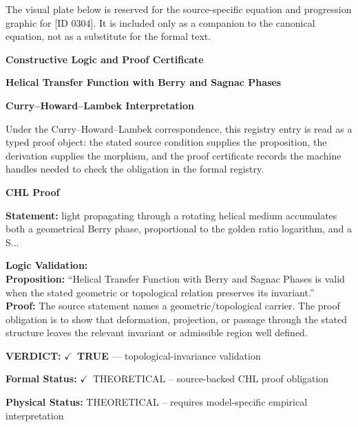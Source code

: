 \begingroup\footnotesize\sloppy
The visual plate below is reserved for the source-specific equation and progression graphic for [ID 0304]. It is included only as a companion to the canonical equation, not as a substitute for the formal text.
\par\endgroup
\ifTZPDarkEdition
{}
\fi

\clearpage
\begingroup\tzpsupportsetup
\noindent\textbf{\fontsize{10.8pt}{12.8pt}\selectfont [ID 0304] Constructive Logic and Proof Certificate}\par
\noindent\textbf{\fontsize{10pt}{12pt}\selectfont Helical Transfer Function with Berry and Sagnac Phases}\par
\vspace{0.45em}
\begingroup
\footnotesize
\setlength{\parskip}{0.22em}
\setlength{\parindent}{0pt}
\noindent\textbf{Curry--Howard--Lambek Interpretation}\par
Under the Curry--Howard--Lambek correspondence, this registry entry is read as a typed proof
object: the stated source condition supplies the proposition, the derivation supplies the
morphism, and the proof certificate records the machine handles needed to check the obligation
in the formal registry.

\vspace{0.45em}
\noindent\textbf{CHL Proof}\par
\textbf{Statement:} light propagating through a rotating helical medium accumulates both a geometrical Berry
phase, proportional to the golden ratio logarithm, and a S...

\textbf{Logic Validation:}\\
\textbf{Proposition:} ``Helical Transfer Function with Berry and Sagnac Phases is valid when the stated
geometric or topological relation preserves its invariant.''\\
\textbf{Proof:} The source statement names a geometric/topological carrier. The proof obligation is to
show that deformation, projection, or passage through the stated structure leaves the
relevant invariant or admissible region well defined.

\textbf{VERDICT:} \ensuremath{\checkmark}\ \textbf{TRUE} --- topological-invariance validation

\textbf{Formal Status:} \ensuremath{\checkmark}\ THEORETICAL -- source-backed CHL proof obligation

\textbf{Physical Status:} THEORETICAL -- requires model-specific empirical interpretation
\par\vspace{0.45em}
\par
\ifTZPDarkEdition
{}
\fi
\endgroup
\endgroup
